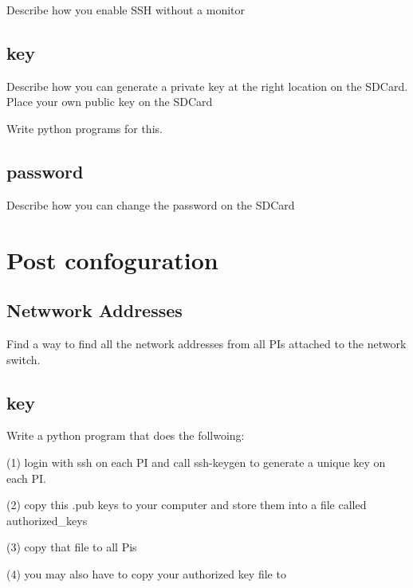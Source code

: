 \begin{exercise}
Describe how you enable SSH without a monitor
\end{exercise}

\subsection{key}

\begin{exercise}
Describe how you can generate a private key at the right location on
the SDCard. Place your own public key on the SDCard

Write python programs for this.
\end{exercise}


\subsection{password}

\begin{exercise}
Describe how you can change the password on the SDCard
\end{exercise}


\section{Post confoguration}

\subsection{Netwwork Addresses}

\begin{exercise}
Find a way to find all the network addresses from all PIs attached to
the network switch.
\end{exercise}


\subsection{key}


\begin{exercise}

Write a python program that does the follwoing:

(1) login with ssh on each PI and call ssh-keygen to generate a unique
key on each PI.

(2) copy this .pub keys to your computer and store them into a file
called authorized_keys

(3) copy that file to all Pis

(4) you may also have to copy your authorized key file to 

\end{exercise}

